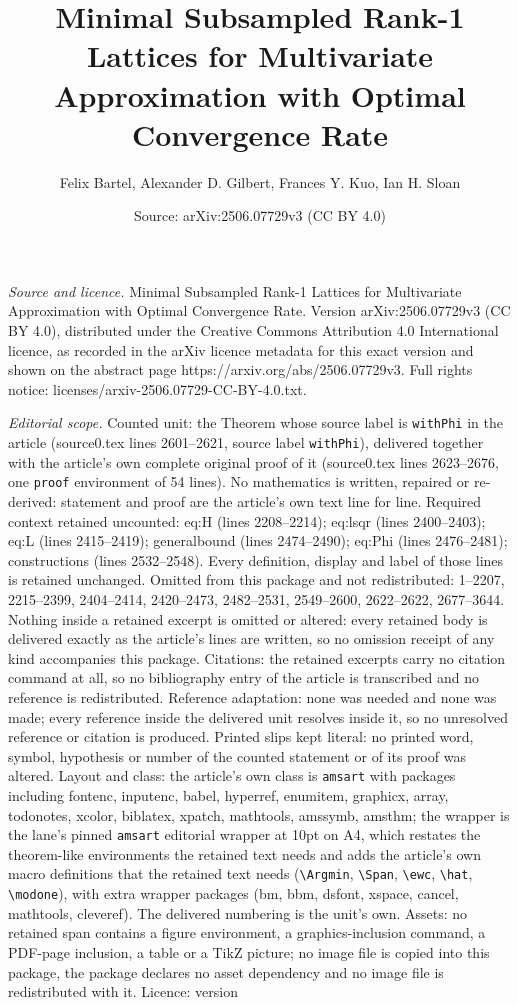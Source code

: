\documentclass[10pt,a4paper]{amsart}
\title[Minimal Subsampled Rank-1 Lattices for Multivariate Approxim]{Minimal Subsampled Rank-1 Lattices for Multivariate Approximation with Optimal Convergence Rate}
\author{Felix Bartel, Alexander D. Gilbert, Frances Y. Kuo, Ian H. Sloan}
\date{Source: arXiv:2506.07729v3 (CC BY 4.0)}
\begin{document}
\maketitle

\noindent\emph{Source and licence.} Minimal Subsampled Rank-1 Lattices for Multivariate Approximation with Optimal Convergence Rate. Version arXiv:2506.07729v3 (CC BY 4.0), distributed under the Creative Commons Attribution 4.0 International licence, as recorded in the arXiv licence metadata for this exact version and shown on the abstract page https://arxiv.org/abs/2506.07729v3. Full rights notice: licenses/arxiv-2506.07729-CC-BY-4.0.txt.\par\smallskip

\noindent\textit{Editorial scope.} Counted unit: the Theorem whose source label is \texttt{withPhi} in the article (source0.tex lines 2601--2621, source label \texttt{withPhi}), delivered together with the article's own complete original proof of it (source0.tex lines 2623--2676, one \texttt{proof} environment of 54 lines). No mathematics is written, repaired or re-derived: statement and proof are the article's own text line for line. Required context retained uncounted: eq:H (lines 2208--2214); eq:lsqr (lines 2400--2403); eq:L (lines 2415--2419); generalbound (lines 2474--2490); eq:Phi (lines 2476--2481); constructions (lines 2532--2548). Every definition, display and label of those lines is retained unchanged. Omitted from this package and not redistributed: 1--2207, 2215--2399, 2404--2414, 2420--2473, 2482--2531, 2549--2600, 2622--2622, 2677--3644. Nothing inside a retained excerpt is omitted or altered: every retained body is delivered exactly as the article's lines are written, so no omission receipt of any kind accompanies this package. Citations: the retained excerpts carry no citation command at all, so no bibliography entry of the article is transcribed and no reference is redistributed. Reference adaptation: none was needed and none was made; every reference inside the delivered unit resolves inside it, so no unresolved reference or citation is produced. Printed slips kept literal: no printed word, symbol, hypothesis or number of the counted statement or of its proof was altered. Layout and class: the article's own class is \texttt{amsart} with packages including fontenc, inputenc, babel, hyperref, enumitem, graphicx, array, todonotes, xcolor, biblatex, xpatch, mathtools, amssymb, amsthm; the wrapper is the lane's pinned \texttt{amsart} editorial wrapper at 10pt on A4, which restates the theorem-like environments the retained text needs and adds the article's own macro definitions that the retained text needs (\texttt{\textbackslash Argmin}, \texttt{\textbackslash Span}, \texttt{\textbackslash ewc}, \texttt{\textbackslash hat}, \texttt{\textbackslash modone}), with extra wrapper packages (bm, bbm, dsfont, xspace, cancel, mathtools, cleveref). The delivered numbering is the unit's own. Assets: no retained span contains a figure environment, a graphics-inclusion command, a PDF-page inclusion, a table or a TikZ picture; no image file is copied into this package, the package declares no asset dependency and no image file is redistributed with it. Licence: version 
\end{document}
